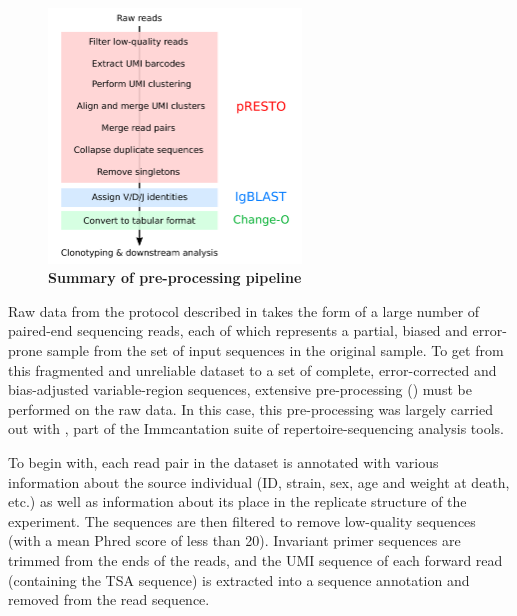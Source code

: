 \begin{figure}
\centering
\caption{\textbf{Summary of \igseq pre-processing pipeline}}
\label{fig:igrace-preprocessing}
\includegraphics[width=0.6\textwidth]{_Figures/png_edited/igseq-preprocessing}
\vspace{0.5em}
\end{figure}

Raw \igseq data from the protocol described in  takes the form of a large number of paired-end sequencing reads, each of which represents a partial, biased and error-prone sample from the set of input sequences in the original sample. To get from this fragmented and unreliable dataset to a set of complete, error-corrected and bias-adjusted \igh{} variable-region sequences, extensive pre-processing () must be performed on the raw data. In this case, this pre-processing was largely carried out with  \parencite{vanderheiden2014presto}, part of the Immcantation suite of repertoire-sequencing analysis tools.

To begin with, each read pair in the dataset is annotated with various information about the source individual (ID, strain, sex, age and weight at death, etc.) as well as information about its place in the replicate structure of the experiment. The sequences are then filtered to remove low-quality sequences (with a mean Phred score of less than 20). %
Invariant primer sequences are trimmed from the ends of the reads, and the UMI sequence of each forward read (containing the TSA sequence) is extracted into a sequence annotation and removed from the read sequence.

